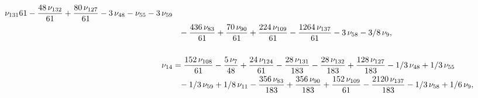 \documentclass[a4paper,12pt, DIV=14, BCOR=5mm, twoside, headsepline, numbers=noenddot]{scrbook}
\begin{document}
\begin{align}
\begin{aligned}
{{\,\nu_{{131}}}{61}}-{\frac {48\,\nu_{{132}}}{61}}+{\frac {80\,\nu_{{
127}}}{61}}-3\,\nu_{{48}}-\nu_{{55}}-3\,\nu_{{59}}\\
 &\hphantom{=} -{\frac {436\,\nu_{{
83}}}{61}}+{\frac {70\,\nu_{{90}}}{61}}+{\frac {224\,\nu_{{109}}}{61}}
-{\frac {1264\,\nu_{{137}}}{61}}-3\,\nu_{{58}}-3/8\,\nu_{{9}}, \\
\\
\nu_{{14
}}&={\frac {152\,\nu_{{108}}}{61}}-{\frac {5\,\nu_{{7}}}{48}}+{\frac {
24\,\nu_{{124}}}{61}}-{\frac {28\,\nu_{{131}}}{183}}-{\frac {28\,\nu_{
{132}}}{183}}+{\frac {128\,\nu_{{127}}}{183}}-1/3\,\nu_{{48}}+1/3\,\nu
_{{55}}\\
 &\hphantom{=}-1/3\,\nu_{{59}}+1/8\,\nu_{{11}}-{\frac {356\,\nu_{{83}}}{183}}
+{\frac {356\,\nu_{{90}}}{183}}+{\frac {152\,\nu_{{109}}}{61}}-{\frac 
{2120\,\nu_{{137}}}{183}}-1/3\,\nu_{{58}}+1/6\,\nu_{{9}}, \\
\end{aligned}
\end{align}
\end{document}
